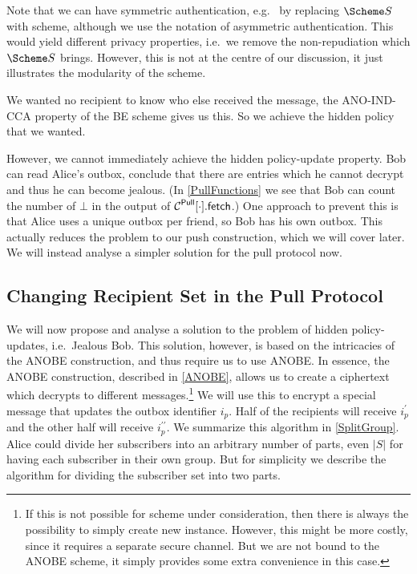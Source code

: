 Note that we can have symmetric authentication, e.g.\  by replacing 
\(\S\) with  scheme, although we use the notation of asymmetric 
authentication.
This would yield different privacy properties, i.e.\ we remove the 
non-repudiation which \(\S\) brings.
However, this is not at the centre of our discussion, it just illustrates the 
modularity of the scheme.

We wanted no recipient to know who else received the message, the ANO-IND-CCA 
property of the \ac{BE} scheme gives us this.
So we achieve the hidden policy that we wanted.

However, we cannot immediately achieve the hidden policy-update property.
Bob can read Alice's outbox, conclude that there are entries which he cannot 
decrypt and thus he can become jealous.
(In \cref{PullFunctions} we see that Bob can count the number of \(\bot\) in 
the output of \(\pget{\cdot}\).)
One approach to prevent this is that Alice uses a unique outbox per friend, so 
Bob has his own outbox.
This actually reduces the problem to our push construction, which we will cover 
later.
We will instead analyse a simpler solution for the pull protocol now.

\subsection{Changing Recipient Set in the Pull Protocol}
\label{ChangingPullRecipientSet}

We will now propose and analyse a solution to the problem of hidden 
policy-updates, i.e.\ Jealous Bob.
This solution, however, is based on the intricacies of the \ac{ANOBE} 
construction, and thus require us to use \ac{ANOBE}.
In essence, the \ac{ANOBE} construction, described in \cref{ANOBE}, allows us 
to create a ciphertext which decrypts to different messages.\footnote{%
  If this is not possible for  scheme under consideration, then there 
  is always the possibility to simply create new instance.
  However, this might be more costly, since it requires a separate secure 
  channel.
  But we are not bound to the \ac{ANOBE} scheme, it simply provides some extra 
  convenience in this case.
}
We will use this to encrypt a special message that updates the outbox 
identifier \(i_p\).
Half of the recipients will receive \(i_p^\prime\) and the other half will 
receive \(i_p^{\prime\prime}\).
We summarize this algorithm in \cref{SplitGroup}.
Alice could divide her subscribers into an arbitrary number of parts, even 
\(|S|\) for having each subscriber in their own group.
But for simplicity we describe the algorithm for dividing the subscriber set 
into two parts.

